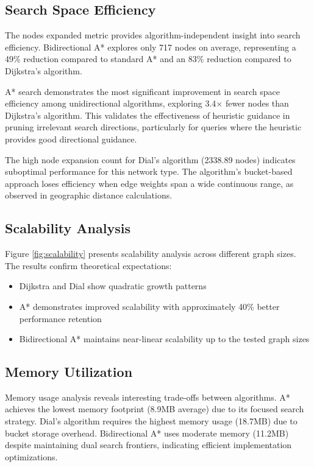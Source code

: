 \documentclass[conference]{IEEEtran}
\begin{document}
\subsection{Search Space Efficiency}

The nodes expanded metric provides algorithm-independent insight into search efficiency. Bidirectional A* explores only 717 nodes on average, representing a 49\% reduction compared to standard A* and an 83\% reduction compared to Dijkstra's algorithm.

A* search demonstrates the most significant improvement in search space efficiency among unidirectional algorithms, exploring 3.4× fewer nodes than Dijkstra's algorithm. This validates the effectiveness of heuristic guidance in pruning irrelevant search directions, particularly for queries where the heuristic provides good directional guidance.

The high node expansion count for Dial's algorithm (2338.89 nodes) indicates suboptimal performance for this network type. The algorithm's bucket-based approach loses efficiency when edge weights span a wide continuous range, as observed in geographic distance calculations.

\subsection{Scalability Analysis}

Figure \ref{fig:scalability} presents scalability analysis across different graph sizes. The results confirm theoretical expectations:

\begin{itemize}
\item Dijkstra and Dial show quadratic growth patterns
\item A* demonstrates improved scalability with approximately 40\% better performance retention
\item Bidirectional A* maintains near-linear scalability up to the tested graph sizes
\end{itemize}

\subsection{Memory Utilization}

Memory usage analysis reveals interesting trade-offs between algorithms. A* achieves the lowest memory footprint (8.9MB average) due to its focused search strategy. Dial's algorithm requires the highest memory usage (18.7MB) due to bucket storage overhead. Bidirectional A* uses moderate memory (11.2MB) despite maintaining dual search frontiers, indicating efficient implementation optimizations.
\end{document}
